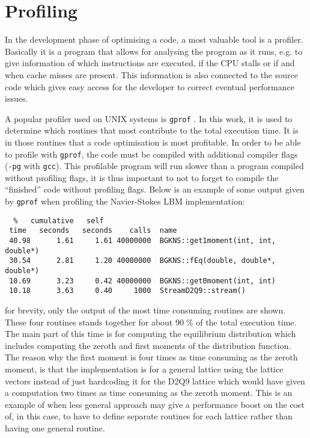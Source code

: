 \section{Profiling}\label{sec:hpc:prof}
In the development phase of optimising a code, a most valuable tool is
a profiler. Basically it is a program that allows for analysing the
program as it runs, e.g. to give information of which instructions are
executed, if the CPU stalls or if and when cache misses are
present. This information is also connected to the source code which
gives easy access for the developer to correct eventual performance
issues.

A popular profiler used on UNIX systems is \texttt{gprof}
\cite{gprof}. In this work, it is used to determine which routines
that most contribute to the total execution time. It is in those
routines that a code optimisation is most profitable. In order to be
able to profile with \texttt{gprof}, the code must be compiled with
additional compiler flags (\texttt{-pg} with \texttt{gcc}). This
profilable program will run slower than a program compiled without
profiling flags, it is thus important to not to forget to compile the
``finished'' code without profiling flags. Below is an example of some
output given by \texttt{gprof} when profiling the Navier-Stokes LBM
implementation:

\begin{verbatim}
  %   cumulative   self                         
 time   seconds   seconds    calls  name    
 40.98      1.61     1.61 40000000  BGKNS::get1moment(int, int, double*)
 30.54      2.81     1.20 40000000  BGKNS::fEq(double, double*, double*)
 10.69      3.23     0.42 40000000  BGKNS::get0moment(int, int)
 10.18      3.63     0.40     1000  StreamD2Q9::stream()
\end{verbatim}
for brevity, only the output of the most time consuming routines are
shown. These four routines stands together for about 90$\;$\% of the
total execution time. The main part of this time is for computing the
equilibrium distribution which includes computing the zeroth and first
moments of the distribution function. The reason why the first moment
is four times as time consuming as the zeroth moment, is that the
implementation is for a general lattice using the lattice vectors
instead of just hardcoding it for the D2Q9 lattice which would have
given a computation two times as time consuming as the zeroth moment.
This is an example of when less general approach may give a
performance boost on the cost of, in this case, to have to define
separate routines for each lattice rather than having one general
routine.

